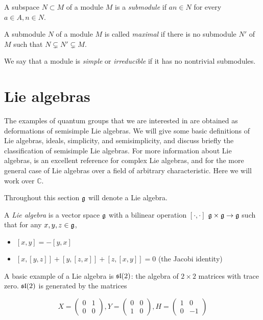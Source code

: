 \begin{defn}
    A subspace $N \subset M$ of a module $M$ is a \emph{submodule} if $an \in
    N$ for every $a \in A, n\in N$.
\end{defn}

\begin{defn}
    A submodule $N$ of a module $M$ is called \emph{maximal} if there is no
    submodule $N'$ of $M$ such that $N \subsetneq N' \subsetneq M$.
\end{defn}

\begin{defn}
    We say that a module is \emph{simple} or \emph{irreducible} if it has no
    nontrivial submodules.
\end{defn}

\section{Lie algebras}

The examples of quantum groups that we are interested in are obtained as
deformations of semisimple Lie algebras. We will give some basic definitions of
Lie algebras, ideals, simplicity, and semisimplicity, and discuss briefly the
classification of semisimple Lie algebras.  For more information about Lie
algebras, \cite{Hall2003} is an excellent reference for complex Lie algebras,
and \cite{Humphreys1973} for the more general case of Lie algebras over a
field of arbitrary characteristic. Here we will work over $\mathbb{C}$.


Throughout this section $\mathfrak{g}$ will denote a Lie algebra.

A \emph{Lie algebra} is a vector space $\mathfrak{g}$ with a bilinear operation
$\left[ \cdot, \cdot \right]$  $\mathfrak{g} \times \mathfrak{g} \to
\mathfrak{g}$ such that for any $x,y,z\in \mathfrak{g}$,

\begin{itemize}
    \item $\left[ x,y \right] = -\left[ y,x \right]$
    \item $\left[ x, \left[ y,z \right] \right] + \left[ y, \left[ z,x \right] \right] + \left[ z, \left[ x,y \right] \right] = 0$ (the Jacobi identity)
\end{itemize}

A basic example of a Lie algebra is $\mathfrak{sl}(2)$: the algebra of $2 \times 2$
matrices with trace zero. $\mathfrak{sl}(2)$ is generated by the matrices 

\begin{equation}
    X = \begin{pmatrix} 0 & 1 \\ 0 & 0 \end{pmatrix},
    Y = \begin{pmatrix} 0 & 0 \\ 1 & 0 \end{pmatrix}, 
    H = \begin{pmatrix} 1 & 0 \\ 0 &-1 \end{pmatrix}
\end{equation}

